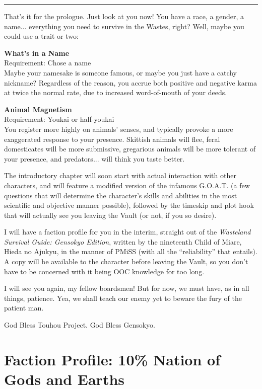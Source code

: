 \documentclass[a4paper,12pt]{book}
\newenvironment{commentary}%
	{
		\vfill%
		\hrule%
		\begin{footnotesize}%
		\color{MidnightBlue}%
	}%
	{%
		\end{footnotesize}%
	}
\begin{document}
\begin{commentary}
That's it for the prologue. Just look at you now! You have a race, a gender, a name... everything you need to survive in the Wastes, right? Well, maybe you could use a trait or two:

\textbf{What's in a Name}\\
Requirement: Chose a name\\
Maybe your namesake is someone famous, or maybe you just have a catchy nickname? Regardless of the reason, you accrue both positive and negative karma at twice the normal rate, due to increased word-of-mouth of your deeds.

\textbf{Animal Magnetism}\\
Requirement: Youkai or half-youkai\\
You register more highly on animals' senses, and typically provoke a more exaggerated response to your presence. Skittish animals will flee, feral domesticates will be more submissive, gregarious animals will be more tolerant of your presence, and predators... will think you taste better.

The introductory chapter will soon start with actual interaction with other characters, and will feature a modified version of the infamous G.O.A.T. (a few questions that will determine the character's skills and abilities in the most scientific and objective manner possible), followed by the timeskip and plot hook that will actually see you leaving the Vault (or not, if you so desire).

I will have a faction profile for you in the interim, straight out of the \emph{Wasteland Survival Guide: Gensokyo Edition}, written by the nineteenth Child of Miare, Hieda no Ajukyu, in the manner of PMiSS (with all the ``reliability'' that entails). A copy will be available to the character before leaving the Vault, so you don't have to be concerned with it being OOC knowledge for too long.

I will see you again, my fellow boardsmen! But for now, we must have, as in all things, patience. Yea, we shall teach our enemy yet to beware the fury of the patient man.

God Bless Touhou Project. God Bless Gensokyo.
\end{commentary}




\chapter{Faction Profile: 10\% Nation of Gods and Earths}
\end{document}
